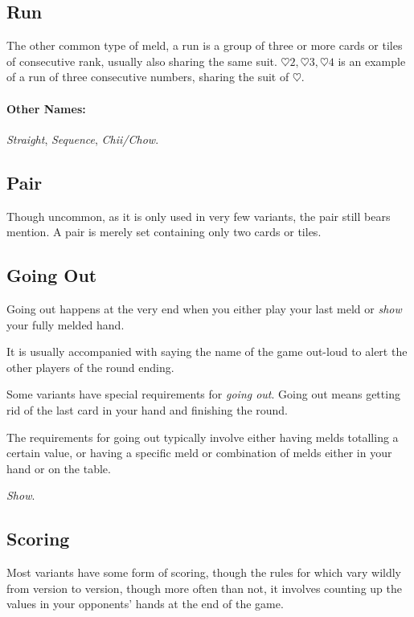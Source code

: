 \subsection{Run}
The other common type of meld, a run is a group of three or more cards or tiles of consecutive rank, usually also sharing the same suit.
$\heartsuit 2, \heartsuit 3, \heartsuit 4$ is an example of a run of three consecutive numbers, sharing the suit of $\heartsuit$.
\paragraph{Other Names:} \textit{Straight}, \textit{Sequence}, \textit{Chii/Chow}.

\subsection{Pair}
Though uncommon, as it is only used in very few variants, the pair still bears mention.
A pair is merely set containing only two cards or tiles.

\subsection{Going Out}
Going out happens at the very end when you either play your last meld or \textit{show} your fully melded hand.

It is usually accompanied with saying the name of the game out-loud to alert the other players of the round ending.

Some variants have special requirements for \textit{going out}. Going out means getting rid of the last card in your hand and finishing the round.

The requirements for going out typically involve either having melds totalling a certain value, or having a specific meld or combination of melds either in your hand or on the table.

\otherNames \textit{Show}.

\subsection{Scoring}
Most variants have some form of scoring, though the rules for which vary wildly from version to version, though more often than not, it involves counting up the values in your opponents' hands at the end of the game.